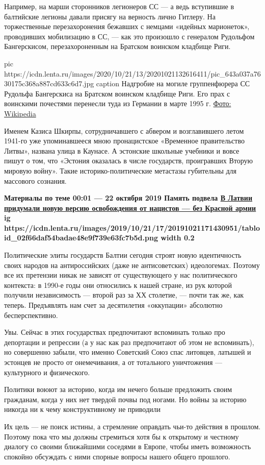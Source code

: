 Например, на марши сторонников легионеров СС — а ведь вступившие в балтийские
легионы давали присягу на верность лично Гитлеру. На торжественные
перезахоронения бежавших с немцами «идейных марионеток», проводивших
мобилизацию в СС, — как это произошло с генералом Рудольфом Бангерскисом,
перезахороненным на Братском воинском кладбище Риги.

\ifcmt
pic https://icdn.lenta.ru/images/2020/10/21/13/20201021132616411/pic_643a037a7630175c368a887cd633c6d7.jpg
caption Надгробие на могиле группенфюрера СС Рудольфа Бангерскиса на Братском воинском кладбище Риги. Его прах с воинскими почестями перенесли туда из Германии в марте 1995 г.  \href{https://upload.wikimedia.org/wikipedia/commons/0/06/BraluKapi_Bangerskis.jpg}{Фото: Wikipedia}
\fi


Именем Казиса Шкирпы, сотрудничавшего с абвером и возглавившего летом 1941-го
уже упоминавшееся мною пронацистское «Временное правительство Литвы», названа
улица в Каунасе. А эстонские школьные учебники и вовсе пишут о том, что
«Эстония оказалась в числе государств, проигравших Вторую мировую войну». Такие
историко-политические метастазы губительны для массового сознания.

\begin{leftbar}
	\bfseries
	Материалы по теме
00:01 — 22 октября 2019
Память подвела
\href{https://lenta.ru/articles/2019/10/22/free_riga/}{В Латвии придумали новую версию освобождения от нацистов — без Красной армии}
\ifcmt
	ig https://icdn.lenta.ru/images/2019/10/21/17/20191021171430951/tabloid_02f66daf54badae48e9f739e63fc7b5d.png
	width 0.2
\fi
\end{leftbar}

Политические элиты государств Балтии сегодня строят новую идентичность своих
народов на антироссийских (даже не антисоветских) идеологемах. Поэтому все их
претензии никак не зависят от существующего у нас политического контекста: в
1990-е годы они относились к нашей стране, из рук которой получили
независимость — второй раз за ХХ столетие, — почти так же, как теперь.
Предъявлять нам счет за десятилетия «оккупации» абсолютно бесперспективно.


Увы. Сейчас в этих государствах предпочитают вспоминать только про депортации и
репрессии (а у нас как раз предпочитают об этом не вспоминать), но совершенно
забыли, что именно Советский Союз спас литовцев, латышей и эстонцев не просто
от онемечивания, а от тотального уничтожения — культурного и физического.

\begin{leftbar}
	\large
Политики воюют за историю, когда им нечего больше предложить своим гражданам,
когда у них нет твердой почвы под ногами. Но войны за историю никогда
ни к чему конструктивному не приводили
\end{leftbar}

Их цель — не поиск истины, а стремление оправдать чьи-то действия в прошлом.
Поэтому пока что мы должны стремиться хотя бы к открытому и честному диалогу со
своими ближайшими соседями в Европе, чтобы иметь возможность спокойно обсуждать
с ними спорные вопросы нашего общего прошлого.
